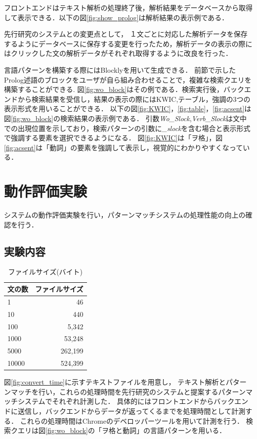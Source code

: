 \documentclass{FITpaper}
\begin{document}
フロントエンドはテキスト解析の処理終了後，解析結果をデータベースから取得して表示できる．以下の図\ref{fig:show_prolog}は解析結果の表示例である．

先行研究のシステムとの変更点として，
１文ごとに対応した解析データを保存するようにデータベースに保存する変更を行ったため，解析データの表示の際にはクリックした文の解析データがそれぞれ取得するように改良を行った．

言語パターンを構築する際にはBlocklyを用いて生成できる．
前節で示したProlog述語のブロックをユーザが自ら組み合わせることで，複雑な検索クエリを構築することができる.
図\ref{fig:wo_block}はその例である．検索実行後，バックエンドから検索結果を受信し，結果の表示の際にはKWIC,テーブル，強調の3つの表示形式を用いることができる．
以下の図\ref{fig:KWIC}，\ref{fig:table}，\ref{fig:acsent}は図\ref{fig:wo_block}の検索結果の表示例である．
引数\textit{Wo\_Slock},\textit{Verb\_Slock}は文中での出現位置を示しており，検索パターンの引数に\textit{\_slock}を含む場合と表示形式で強調する要素を選択できるようになる．
図\ref{fig:KWIC}は「ヲ格」，図\ref{fig:acsent}は「動詞」の要素を強調して表示し，視覚的にわかりやすくなっている．




\section{動作評価実験}
システムの動作評価実験を行い，パターンマッチシステムの処理性能の向上の確認を行う．

\subsection{実験内容}
\begin{table}[htbp]
  \centering
    \caption{ファイルサイズ(バイト)}
    \label{fig:tex}
    \begin{tabular}{|l||r|}  
      \hline
      文の数 & ファイルサイズ\\ \hline \hline
      1 & 46\\\hline
      10 & 440 \\\hline
      100 & 5,342\\ \hline
      1000 & 53,248 \\\hline
      5000 &  262,199 \\\hline
      10000 &  524,399\\ \hline
    \end{tabular}
  \end{table}

図\ref{fig:convert_time}に示すテキストファイルを用意し，
テキスト解析とパターンマッチを行い，これらの処理時間を先行研究のシステムと提案するパターンマッチシステムでそれぞれ計測した．
具体的にはフロントエンドからバックエンドに送信し，バックエンドからデータが返ってくるまでを処理時間として計測する．
これらの処理時間はChromeのデベロッパーツールを用いて計測を行う．
検索クエリは図\ref{fig:wo_block}の「ヲ格と動詞」の言語パターンを用いる．
\end{document}
